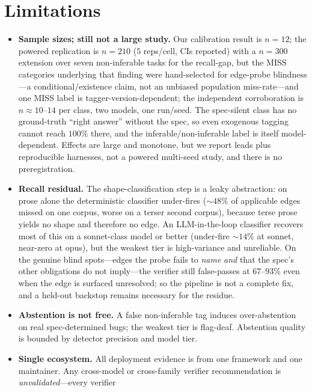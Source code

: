\documentclass[11pt]{article}
\begin{document}
\section{Limitations}
\label{sec:limitations}

\begin{itemize}[leftmargin=1.4em,itemsep=2pt]
\item \textbf{Sample sizes; still not a large study.} Our calibration result is $n=12$; the powered
replication is $n=210$ ($5$ reps/cell, CIs reported) with a $n=300$ extension over seven non-inferable
tasks for the recall-gap, but the MISS categories underlying that finding were hand-selected for
edge-probe blindness---a conditional/existence claim, not an unbiased population miss-rate---and one
MISS label is tagger-version-dependent; the independent corroboration is $n\approx10$--$14$ per
class, two models, one run/seed. The spec-silent class has no ground-truth ``right answer'' without the
spec, so even exogenous tagging cannot reach $100\%$ there, and the inferable/non-inferable label is
itself model-dependent. Effects are large and monotone, but we report leads plus reproducible harnesses,
not a powered multi-seed study, and there is no preregistration.
\item \textbf{Recall residual.} The shape-classification step
is a leaky abstraction: on prose alone the deterministic classifier under-fires
($\sim\!48\%$ of applicable edges missed on one corpus, worse on a terser second corpus), because
terse prose yields no shape and therefore no edge. An
LLM-in-the-loop classifier recovers most of this on a sonnet-class model or better (under-fire
$\sim\!14\%$ at sonnet, near-zero at opus), but the weakest tier is high-variance and unreliable. On the
genuine blind spots---edges the probe fails to \emph{name} \emph{and} that the spec's other obligations
do not imply---the verifier still false-passes at $67$--$93\%$ even when the edge is surfaced unresolved;
so the pipeline is not a complete fix, and a held-out backstop remains necessary
for the residue.
\item \textbf{Abstention is not free.} A false non-inferable tag induces over-abstention on real
spec-determined bugs; the weakest tier is flag-deaf. Abstention quality is bounded by detector
precision and model tier.
\item \textbf{Single ecosystem.} All deployment evidence is from one framework and one maintainer.
Any cross-model or cross-family verifier recommendation is \emph{unvalidated}---every verifier

\end{itemize}
\end{document}
